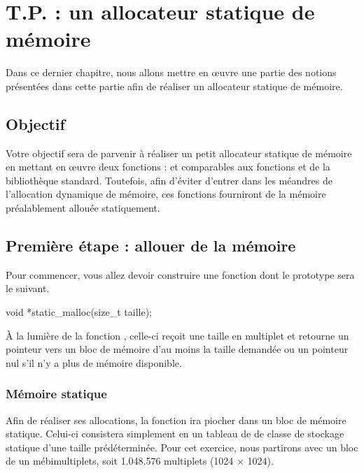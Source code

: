 \chapter{T.P. : un allocateur statique de mémoire}
\label{T.P.-:-un-allocateur-statique-de-memoire}

Dans ce dernier chapitre, nous allons mettre en œuvre une partie des notions 
présentées dans cette partie afin de réaliser un allocateur statique de
mémoire.


\section{Objectif}
\label{objectif}

Votre objectif sera de parvenir à réaliser un petit allocateur statique de 
mémoire en mettant en œuvre deux fonctions :  et
 comparables aux fonctions  et
 de la bibliothèque standard. Toutefois, afin d'éviter
d'entrer dans les méandres de l'allocation dynamique de mémoire, ces
fonctions fourniront de la mémoire préalablement allouée
statiquement.


\section{Première étape : allouer de la mémoire}
\label{premiere-etape-:-allouer-de-la-memoire}


Pour commencer, vous allez devoir construire une fonction
 dont le prototype sera le suivant.

\begin{C}
void *static_malloc(size_t taille);
\end{C}

À la lumière de la fonction , celle-ci reçoit une
taille en multiplet et retourne un pointeur vers un bloc de mémoire d'au
moins la taille demandée ou un pointeur nul s'il n'y a plus de mémoire
disponible.

\subsection{Mémoire statique}
\label{memoire-statique}

Afin de réaliser ses allocations, la fonction 
ira piocher dans un bloc de mémoire statique. Celui-ci consistera
simplement en un tableau de  de classe de stockage statique
d'une taille prédéterminée. Pour cet exercice, nous partirons avec un
bloc de un mébimultiplets, soit 1.048.576 multiplets (1024 × 1024).


